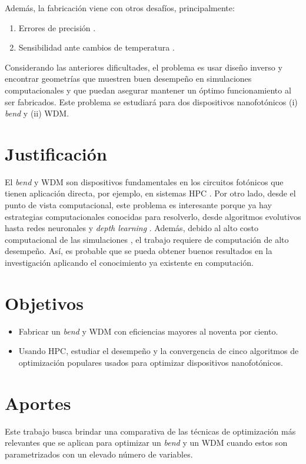 Además, la fabricación viene con otros desafíos, principalmente:

\begin{enumerate}
  \item Errores de precisión \citep{Piggott2017}.
  \item Sensibilidad ante cambios de temperatura \citep{Vuckovic2019}.
\end{enumerate}

Considerando las anteriores dificultades, el problema es usar diseño inverso y encontrar geometrías que muestren buen desempeño en simulaciones computacionales y que puedan asegurar mantener un óptimo funcionamiento al ser fabricados. 
Este problema se estudiará para dos dispositivos nanofotónicos (i) \emph{bend} y (ii) WDM.

\section{Justificación}

El \emph{bend} y WDM son dispositivos fundamentales en los circuitos fotónicos que tienen aplicación directa, por ejemplo, en sistemas HPC \citep{Shen2017}. 
Por otro lado, desde el punto de vista computacional, este problema es interesante porque ya hay estrategias computacionales conocidas para resolverlo, desde algoritmos evolutivos \citep{Hansen2016} hasta redes neuronales \citep{Goodfellow2015} y \emph{depth learning} \citep{Malkiel2018}. 
Además, debido al alto costo computacional de las simulaciones \citep{Schneider2019}, el trabajo requiere de computación de alto desempeño.
Así, es probable que se pueda obtener buenos resultados en la investigación aplicando el conocimiento ya existente en computación. 

\section{Objetivos}

\begin{itemize}

  \item Fabricar un \emph{bend} y WDM con eficiencias mayores al noventa por ciento.

  \item Usando HPC, estudiar el desempeño y la convergencia de cinco algoritmos de optimización populares usados para optimizar dispositivos nanofotónicos.

\end{itemize}



\section{Aportes}

Este trabajo busca brindar una comparativa de las técnicas de optimización más relevantes que se aplican para optimizar un \emph{bend} y un WDM cuando estos son parametrizados con un elevado número de variables.

